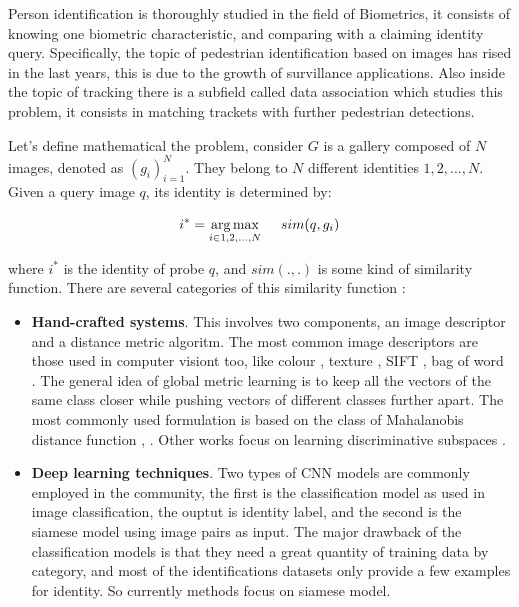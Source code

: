 \documentclass[12pt, a4paper, titlepage,twoside,openright]{article}
\begin{document}
Person identification is thoroughly studied in the field of Biometrics, it consists of  knowing one biometric characteristic, and comparing with a claiming identity query. Specifically, the topic of pedestrian identification based on images has rised in the last years, this is due to the growth of survillance applications. Also inside the topic of tracking there is a subfield called data association which studies this problem, it consists in matching trackets with further pedestrian detections.

Let's define mathematical the problem, consider $G$ is a gallery composed of $N$ images, denoted as $(g_{i})_{i=1}^{N}$. They belong to $N$ different identities $ 1,2,...,N $. Given a query image $q$, its identity is determined by:


$$ i^{*} = \underset{i \in 1,2,...,N}{\arg\max} \hspace{0.5cm} sim(q,g_{i}) $$

where $i^{*}$ is the identity of probe $q$, and $sim( . , . )$ is some kind of similarity function. There are several categories of this similarity function \cite{pastPresent}:

\begin{itemize}
 
\item \textbf{Hand-crafted systems}. This involves two components, an image descriptor and a distance metric algoritm. The most common image descriptors are those used in computer visiont too, like colour \cite{lbp}, texture \cite{pairwise}, SIFT \cite{sift}, bag of word \cite{bagword}. The general idea of global metric learning is to keep all the vectors of the same class closer while pushing vectors of different classes further apart. The most commonly used formulation is based on the class of Mahalanobis distance function \cite{kiisme}, \cite{lnnn}. Other works focus on learning discriminative subspaces \cite{lda}.

\item \textbf{Deep learning techniques}. Two types of CNN models are commonly employed in the community, the first is the classification model as used in image classification, the ouptut is identity label, and the second is the siamese model using image pairs as input. The major drawback of the classification models is that they need a great quantity of training data by category, and most of the identifications datasets only provide a few examples for identity. So currently methods focus on siamese model.

\end{itemize} 
\end{document}
